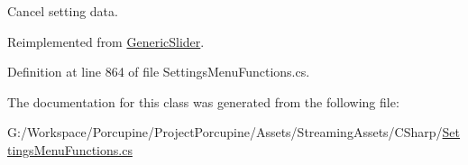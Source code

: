 Cancel setting data. 



Reimplemented from \hyperlink{class_generic_slider_ab22180d2e9abdb678b9797956224651c}{Generic\+Slider}.



Definition at line 864 of file Settings\+Menu\+Functions.\+cs.



The documentation for this class was generated from the following file\+:\begin{DoxyCompactItemize}
\item 
G\+:/\+Workspace/\+Porcupine/\+Project\+Porcupine/\+Assets/\+Streaming\+Assets/\+C\+Sharp/\hyperlink{_settings_menu_functions_8cs}{Settings\+Menu\+Functions.\+cs}\end{DoxyCompactItemize}
